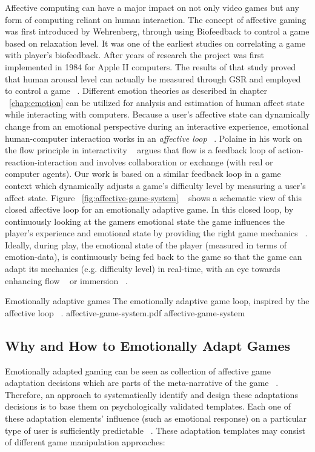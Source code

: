 Affective computing can have a major impact on not only video games but any form of computing reliant on human interaction. The concept of affective gaming was first introduced by Wehrenberg, through using Biofeedback to control a game based on relaxation level. It was one of the earliest studies on correlating a game with player's biofeedback. After years of research the project was first implemented in 1984 for Apple II computers. The results of that study proved that human arousal level can actually be measured through GSR and employed to control a game ~\cite{wehrenberg1995willball}. Different emotion theories as described in chapter ~\ref{chap:emotion} can be utilized for analysis and estimation of human affect state while interacting with computers. Because a user's affective state can dynamically change from an emotional perspective during an interactive experience, emotional human-computer interaction works in an \textit{affective loop} ~\cite{sundstrom2005user}. Polaine in his work on the flow principle in interactivity ~\cite{polaine2005flow} argues that flow is a feedback loop of action-reaction-interaction and involves collaboration or exchange (with real or computer agents). Our work is based on a similar feedback loop in a game context which dynamically adjusts a game's difficulty level by measuring a user's affect state. Figure ~\ref{fig:affective-game-system} ~\cite{tijs2009creating} shows a schematic view of this closed affective loop for an emotionally adaptive game. In this closed loop, by continuously looking at the gamers emotional state the game influences the player's experience and emotional state by providing the right game mechanics ~\cite{hunicke2004mda}. Ideally, during play, the emotional state of the player (measured in terms of emotion-data), is continuously being fed back to the game so that the game can adapt its mechanics (e.g. difficulty level) in real-time, with an eye towards enhancing flow ~\cite{chen2007flow} or immersion ~\cite{nacke2008flow}.

\img
{Emotionally adaptive games}
{The emotionally adaptive game loop, inspired by the affective loop ~\cite{sundstrom2005user}.}
{affective-game-system.pdf}
{affective-game-system}

\subsection{Why and How to Emotionally Adapt Games}
Emotionally adapted gaming can be seen as collection of affective game adaptation decisions which are parts of the meta-narrative of the game ~\cite{saari2009emotionally}. Therefore, an approach to systematically identify and design these adaptations decisions is to base them on psychologically validated templates. Each one of these adaptation elements' influence (such as emotional response) on a particular type of user is sufficiently predictable ~\cite{saari2009emotionally}. These adaptation templates may consist of different game manipulation approaches:

